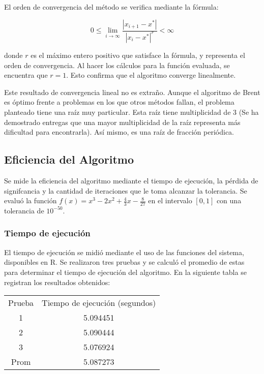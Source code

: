 \documentclass[a4paper,12pt]{article}
\begin{document}
El orden de convergencia del método se verifica mediante la fórmula: \par

\[ 0 \leq \lim_{i\to\infty} \frac{|x_{i+1}-x^*|}{|x_i-x^*|^r} < \infty \]

donde $r$ es el máximo entero positivo que satisface la fórmula, y representa el orden de convergencia. Al hacer los cálculos para la función evaluada, se encuentra que $r=1$. Esto confirma que el algoritmo converge linealmente. \par

Este resultado de convergencia lineal no es extraño. Aunque el algoritmo de Brent es óptimo frente a problemas en los que otros métodos fallan, el problema planteado tiene una raíz muy particular. Esta raíz tiene multiplicidad de 3 (Se ha demostrado entregas que una mayor multiplicidad de la raíz representa más dificultad para encontrarla). Así mismo, es una raíz de fracción periódica. \par

\subsection{Eficiencia del Algoritmo} 

Se mide la eficiencia del algoritmo mediante el tiempo de ejecución, la pérdida de signifcancia y la cantidad de iteraciones que le toma alcanzar la tolerancia. Se evaluó la función $f(x)=x^3-2x^2+\frac{4}{3}x-\frac{8}{27}$ en el intervalo $[0,1]$ con una tolerancia de $10^{-50}$. \par 

\subsubsection{Tiempo de ejecución}

El tiempo de ejecución se midió mediante el uso de las funciones del sistema, disponibles en R. Se realizaron tres pruebas y se calculó el promedio de estas para determinar el tiempo de ejecución del algoritmo.  En la siguiente tabla se registran los resultados obtenidos: \par 

\begin{table}[ht!]
\begin{tabular}{cc}
Prueba & Tiempo de ejecución (segundos) \\
1      & 5.094451                       \\
2      & 5.090444                       \\
3      & 5.076924                       \\
Prom   & 5.087273                      
\end{tabular}
\end{table}
\vspace{-1em}
\end{document}
